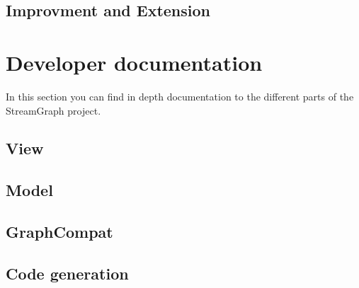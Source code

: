 \documentclass[journal]{IEEEtran}
\begin{document}
\subsection{Improvment and Extension}


\section{Developer documentation}
\noindent In this section you can find in depth documentation to the different
parts of the StreamGraph project.
\subsection{View}



\subsection{Model}



\subsection{GraphCompat}



\subsection{Code generation}

%
%

\end{document}
